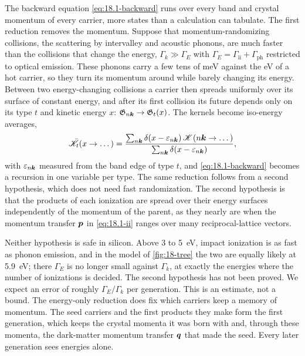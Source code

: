 The backward equation \cref{eq:18.1-backward} runs over every band and crystal momentum of every carrier, more states than a calculation can tabulate. The first reduction removes the momentum. Suppose that momentum-randomizing collisions, the scattering by intervalley and acoustic phonons, are much faster than the collisions that change the energy, $\varGamma_k \gg \varGamma_E$ with $\varGamma_E = \varGamma_{\mathrm{ii}} + \varGamma_{\mathrm{ph}}$ restricted to optical emission. These phonons carry a few tens of meV against the eV of a hot carrier, so they turn its momentum around while barely changing its energy. Between two energy-changing collisions a carrier then spreads uniformly over its surface of constant energy, and after its first collision its future depends only on its type $t$ and kinetic energy $x$: $\mathfrak{G}_{n\bm{k}} \to \mathfrak{G}_t(x)$. The kernels become iso-energy averages,
\begin{equation}
  \bar{\mathscr{K}}_t(x \to \dots) = \frac{\sum_{n\bm{k}}\delta(x - \varepsilon_{n\bm{k}})\,\mathscr{K}(n\bm{k} \to \dots)}{\sum_{n\bm{k}}\delta(x - \varepsilon_{n\bm{k}})} ,
  \label{eq:18.1-isoenergy}
\end{equation}
with $\varepsilon_{n\bm{k}}$ measured from the band edge of type $t$, and \cref{eq:18.1-backward} becomes a recursion in one variable per type. The same reduction follows from a second hypothesis, which does not need fast randomization. The second hypothesis is that the products of each ionization are spread over their energy surfaces independently of the momentum of the parent, as they nearly are when the momentum transfer $\bm{p}$ in \cref{eq:18.1-ii} ranges over many reciprocal-lattice vectors.

Neither hypothesis is safe in silicon. Above 3 to \SI{5}{eV}, impact ionization is as fast as phonon emission, and in the model of \cref{fig:18-tree} the two are equally likely at \SI{5.9}{eV}; there $\varGamma_E$ is no longer small against $\varGamma_k$, at exactly the energies where the number of ionizations is decided. The second hypothesis has not been proved. We expect an error of roughly $\varGamma_E/\varGamma_k$ per generation. This is an estimate, not a bound. The energy-only reduction does fix which carriers keep a memory of momentum. The seed carriers and the first products they make form the first generation, which keeps the crystal momenta it was born with and, through these momenta, the dark-matter momentum transfer $\bm{q}$ that made the seed. Every later generation sees energies alone.

